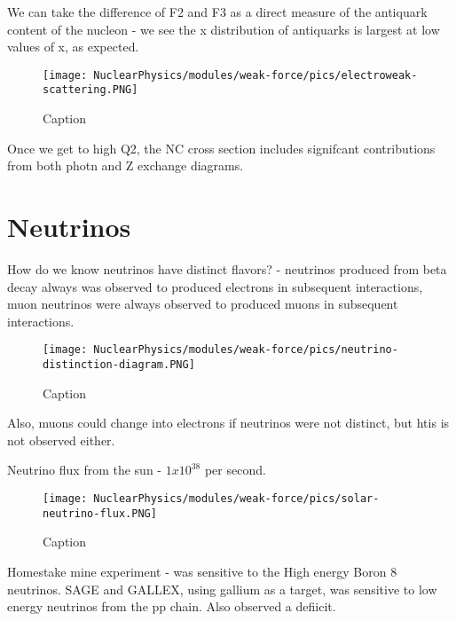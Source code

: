         
        We can take the difference of F2 and F3 as a direct measure of the antiquark content of the nucleon - we see the x distribution of antiquarks is largest at low values of x, as expected. 
        
        
        
            \begin{figure}[H]
                \centering
                \texttt{[image: NuclearPhysics/modules/weak-force/pics/electroweak-scattering.PNG]}
            \caption{Caption}
            \end{figure}
            
        
        Once we get to high Q2, the NC cross section includes signifcant contributions from both photn and Z exchange diagrams.
        
        
        
        
        \section{Neutrinos}
            How do we know neutrinos have distinct flavors?
                - neutrinos produced from beta decay always was observed to produced electrons in subsequent interactions, muon neutrinos were always observed to produced muons in subsequent interactions. 
                
            \begin{figure}[H]
                \centering
                \texttt{[image: NuclearPhysics/modules/weak-force/pics/neutrino-distinction-diagram.PNG]}
            \caption{Caption}
            \end{figure}
            
                
                Also, muons could change into electrons if neutrinos were not distinct, but htis is not observed either. 
                
            Neutrino flux from the sun - $1x10^38$ per second. 
            
            \begin{figure}[H]
                \centering
                \texttt{[image: NuclearPhysics/modules/weak-force/pics/solar-neutrino-flux.PNG]}
            \caption{Caption}
            \end{figure}
            
            
            Homestake mine experiment - was sensitive to the High energy Boron 8 neutrinos. SAGE and GALLEX, using gallium as a target, was sensitive to low energy neutrinos from the pp chain. Also observed a defiicit. 
            
